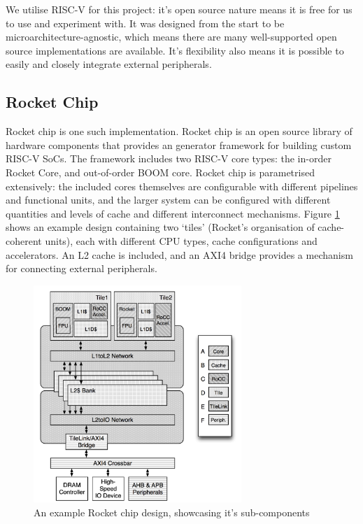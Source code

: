 We utilise RISC-V for this project: it's open source nature means it is free for us to use and experiment with. It was designed from the start to be microarchitecture-agnostic, which means there are many well-supported open source implementations are available. It's flexibility also means it is possible to easily and closely integrate external peripherals.

\subsection{Rocket Chip}

Rocket chip is one such implementation. Rocket chip is an open source library of hardware components that provides an generator framework for building custom RISC-V SoCs. The framework includes two RISC-V core types: the in-order Rocket Core, and out-of-order BOOM core. Rocket chip is parametrised extensively: the included cores themselves are configurable with different pipelines and functional units, and the larger system can be configured with different quantities and levels of cache and different interconnect mechanisms. Figure \ref{fig:rocket} shows an example design containing two `tiles' (Rocket's organisation of cache-coherent units), each with different CPU types, cache configurations and accelerators. An L2 cache is included, and an AXI4 bridge provides a mechanism for connecting external peripherals.

\begin{figure}[h!]
    \centering
    \includegraphics[width=0.7\textwidth]{../img/rocket-chip.png}
    \caption{An example Rocket chip design, showcasing it's sub-components~\cite{rocketchip}}
    \label{fig:rocket}
\end{figure}

